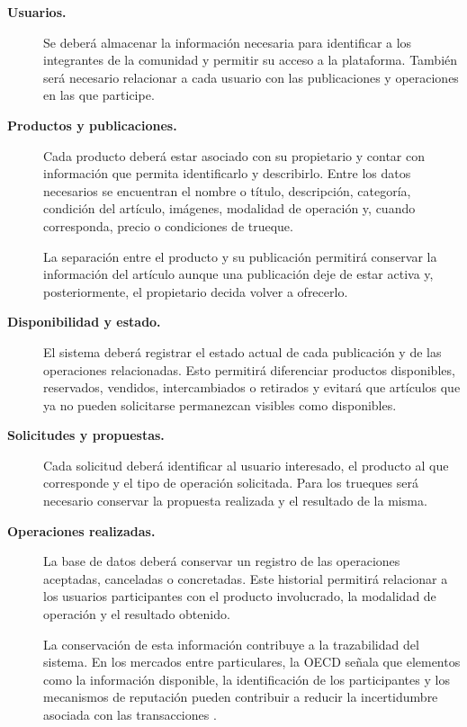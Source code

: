 \documentclass[12pt]{article} %
\begin{document}
\begin{description}
    \item[\textbf{Usuarios.}]
    
    Se deberá almacenar la información necesaria para identificar a los integrantes de la comunidad y permitir su acceso a la plataforma. También será necesario relacionar a cada usuario con las publicaciones y operaciones en las que participe.

    \item[\textbf{Productos y publicaciones.}]
    
    Cada producto deberá estar asociado con su propietario y contar con información que permita identificarlo y describirlo. Entre los datos necesarios se encuentran el nombre o título, descripción, categoría, condición del artículo, imágenes, modalidad de operación y, cuando corresponda, precio o condiciones de trueque.

    La separación entre el producto y su publicación permitirá conservar la información del artículo aunque una publicación deje de estar activa y, posteriormente, el propietario decida volver a ofrecerlo.

    \item[\textbf{Disponibilidad y estado.}]
    
    El sistema deberá registrar el estado actual de cada publicación y de las operaciones relacionadas. Esto permitirá diferenciar productos disponibles, reservados, vendidos, intercambiados o retirados y evitará que artículos que ya no pueden solicitarse permanezcan visibles como disponibles.

    \item[\textbf{Solicitudes y propuestas.}]
    
    Cada solicitud deberá identificar al usuario interesado, el producto al que corresponde y el tipo de operación solicitada. Para los trueques será necesario conservar la propuesta realizada y el resultado de la misma.

    \item[\textbf{Operaciones realizadas.}]
    
    La base de datos deberá conservar un registro de las operaciones aceptadas, canceladas o concretadas. Este historial permitirá relacionar a los usuarios participantes con el producto involucrado, la modalidad de operación y el resultado obtenido.

    La conservación de esta información contribuye a la trazabilidad del sistema. En los mercados entre particulares, la OECD señala que elementos como la información disponible, la identificación de los participantes y los mecanismos de reputación pueden contribuir a reducir la incertidumbre asociada con las transacciones \citep{oecd2017trust}.


\end{description}
\end{document}
